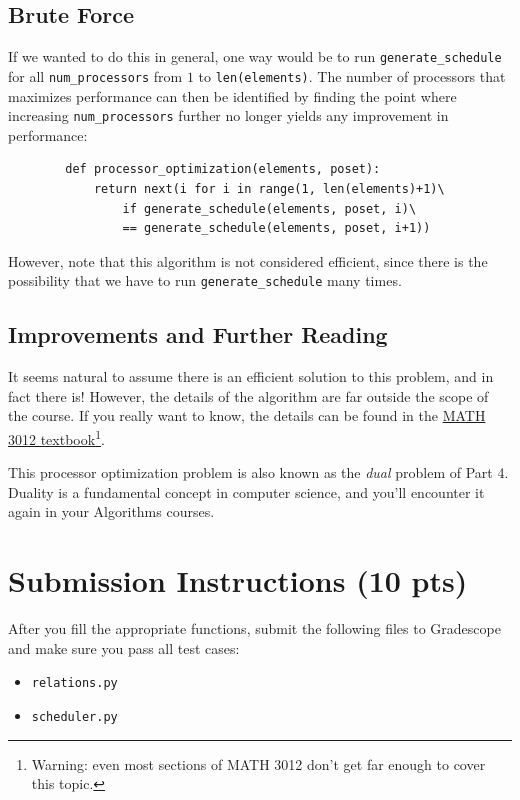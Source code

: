 \documentclass{article}
\begin{document}
    \subsection*{Brute Force}
    If we wanted to do this in general, one way would be to run \lstinline{generate_schedule} for all \lstinline{num_processors} from $1$ to \lstinline{len(elements)}. The number of processors that maximizes performance can then be identified by finding the point where increasing \lstinline{num_processors} further no longer yields any improvement in performance:
    
    \begin{lstlisting}
        def processor_optimization(elements, poset):
            return next(i for i in range(1, len(elements)+1)\
                if generate_schedule(elements, poset, i)\
                == generate_schedule(elements, poset, i+1))
    \end{lstlisting}
    
    However, note that this algorithm is not considered efficient, since there is the possibility that we have to run \lstinline{generate_schedule} many times. 

    \subsection*{Improvements and Further Reading}
    It seems natural to assume there is an efficient solution to this problem, and in fact there is! However, the details of the algorithm are far outside the scope of the course. If you really want to know, the details can be found in the \href{https://www.appliedcombinatorics.org/book/s_flowapplications_chain-partition.html}{MATH 3012 textbook}\footnote{Warning: even most sections of MATH 3012 don't get far enough to cover this topic.}.
    
    \vspace{3mm} This processor optimization problem is also known as the \textit{dual} problem of Part 4. Duality is a fundamental concept in computer science, and you'll encounter it again in your Algorithms courses.

\section*{Submission Instructions (10 pts)}
    After you fill the appropriate functions, submit the following files to Gradescope and make sure you pass all test cases:
    \begin{itemize}
        \item \lstinline{relations.py}
        \item \lstinline{scheduler.py}
    \end{itemize}
\end{document}
